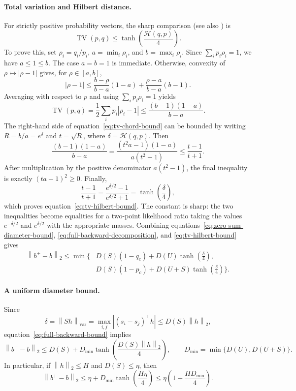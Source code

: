 \documentclass[anon]{opt2026} %
\newcommand{\norm}[1]{\left\lVert #1\right\rVert}
\newcommand{\abs}[1]{\left\lvert #1\right\rvert}
\newcommand{\varnorm}[1]{\left\lVert #1\right\rVert_{\mathrm{var}}}
\begin{document}
\paragraph{Total variation and Hilbert distance.}
For strictly positive probability vectors, the sharp comparison \citep[Proposition~7]{Reeb_2011}
(see also \citep[Theorem~5.1]{cohen2023hyperbolic}) is
\begin{equation}
\operatorname{TV}(p,q)
\leq
\tanh\!\left(\frac{\mathcal H(q,p)}{4}\right).
\label{eq:tv-hilbert-bound}
\end{equation}
To prove this, set $\rho_i=q_i/p_i$,
$a=\min_i\rho_i$, and $b=\max_i\rho_i$. Since $\sum_i p_i\rho_i=1$, we have $a\leq1\leq b$. The case $a=b=1$ is immediate. Otherwise, convexity of $\rho\mapsto\abs{\rho-1}$ gives, for
$\rho\in[a,b]$,
\[
\abs{\rho-1}
\leq
\frac{b-\rho}{b-a}(1-a)
+
\frac{\rho-a}{b-a}(b-1).
\]
Averaging with respect to $p$ and using
$\sum_i p_i\rho_i=1$ yields
\begin{equation}
\operatorname{TV}(p,q)
=
\frac{1}{2}\sum_i p_i\abs{\rho_i-1}
\leq
\frac{(b-1)(1-a)}{b-a}.
\label{eq:tv-chord-bound}
\end{equation}
The right-hand side of equation~\ref{eq:tv-chord-bound} can be bounded by
writing $R=b/a=e^\delta$ and $t=\sqrt R$, where
$\delta=\mathcal H(q,p)$. Then
\[
\frac{(b-1)(1-a)}{b-a}
=
\frac{(t^2a-1)(1-a)}{a(t^2-1)}
\leq
\frac{t-1}{t+1}.
\]
After multiplication by the positive denominator $a(t^2-1)$, the final inequality is exactly $(ta-1)^2\geq0$. Finally,
\[
\frac{t-1}{t+1}
=
\frac{e^{\delta/2}-1}{e^{\delta/2}+1}
=
\tanh\!\left(\frac{\delta}{4}\right),
\]
which proves equation~\ref{eq:tv-hilbert-bound}. The constant is sharp: the
two inequalities become equalities for a two-point likelihood ratio taking
the values $e^{-\delta/2}$ and $e^{\delta/2}$ with the appropriate masses. Combining equations~\ref{eq:zero-sum-diameter-bound},
\ref{eq:full-backward-decomposition}, and
\ref{eq:tv-hilbert-bound} gives
\begin{equation}
\boxed{
\begin{aligned}
\norm{b^+-b}_2
\leq\min\Bigg\{&
D(S)(1-q_c)+D(U)\tanh\!\left(\frac{\delta}{4}\right),\\
&
D(S)(1-p_c)+D(U+S)\tanh\!\left(\frac{\delta}{4}\right)
\Bigg\}.
\end{aligned}
}
\label{eq:full-backward-bound}
\end{equation}

\paragraph{A uniform diameter bound.}
Since
\[
\delta
=
\varnorm{Sh}
=
\max_{i,j}\abs{(s_i-s_j)^\top h}
\leq
D(S)\norm{h}_2,
\]
equation~\ref{eq:full-backward-bound} implies
\begin{equation}
\norm{b^+-b}_2
\leq
D(S)+D_{\min}\tanh\!\left(\frac{D(S)\norm{h}_2}{4}\right),
\qquad
D_{\min}=\min\{D(U),D(U+S)\}.
\label{eq:full-backward-diameter-bound}
\end{equation}
In particular, if $\norm{h}_2\leq H$ and $D(S)\leq\eta$, then
\[
\norm{b^+-b}_2
\leq
\eta+D_{\min}\tanh\!\left(\frac{H\eta}{4}\right)
\leq
\eta\left(1+\frac{H D_{\min}}{4}\right).
\]
\end{document}
